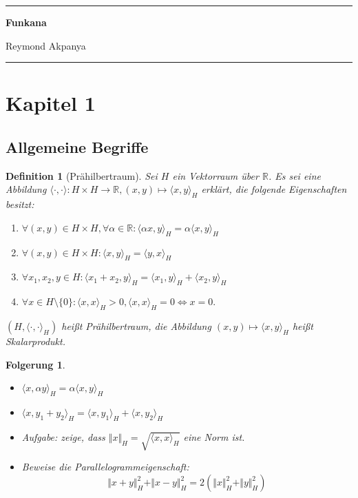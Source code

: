 \documentclass[12pt,titlepage]{article}
\newtheorem{definition}[zahl]{Definition}
\newtheorem{folgerung}[zahl]{Folgerung}
\numberwithin{equation}{section}
\begin{document}
\thispagestyle{empty}
\noindent\rule{\textwidth}{0.5pt}
\centerline{\textbf{\large{Funkana}}}
\centerline{Reymond Akpanya}
\noindent\rule{\textwidth}{0.5pt}
\newline
\section{Kapitel 1}
\subsection{Allgemeine Begriffe}
\begin{definition}[Prähilbertraum]
Sei $H$ ein Vektorraum über $\mathbb{R}$. Es sei eine Abbildung $\langle \cdot  , \cdot \rangle:H \times H \to \mathbb{R}, (x,y) \mapsto \langle x,y \rangle_H$ erklärt, die folgende Eigenschaften besitzt:
\begin{enumerate}
\item $\forall (x,y) \in H \times H, \forall \alpha \in \mathbb{R}:\langle \alpha x, y \rangle_H = \alpha\langle x, y \rangle_H$ 
\item $\forall (x,y) \in H \times H:\langle x, y \rangle_H=\langle y,x \rangle_H$
\item $\forall x_1,x_2,y \in H:\langle x_1+x_2, y \rangle_H=\langle x_1, y \rangle_H+\langle x_2, y \rangle_H$
\item $\forall x \in H\setminus \{0\}:\langle x, x \rangle_H>0,\langle x, x \rangle_H=0 \Leftrightarrow x=0.$
\end{enumerate}
$(H,\langle \cdot, \cdot \rangle_H)$ heißt Prähilbertraum, die Abbildung $(x,y)\mapsto \langle x, y \rangle_H$ heißt Skalarprodukt. 
\end{definition}
\begin{folgerung}
\begin{itemize}
\item $\langle x,\alpha y \rangle_H=\alpha\langle x, y \rangle_H$
\item $\langle x, y_1+y_2 \rangle_H=\langle x, y_1 \rangle_H+\langle x, y_2 \rangle_H$
\item Aufgabe: zeige, dass $\Vert x \Vert_H=\sqrt{\langle x, x \rangle_H}$ eine Norm ist.
\item Beweise die Parallelogrammeigenschaft:
\[
\Vert x+y \Vert_H^2+\Vert x-y \Vert_H^2=2(\Vert x \Vert_H^2+\Vert y \Vert_H^2)
\]
\end{itemize}
\end{folgerung}
\end{document}
